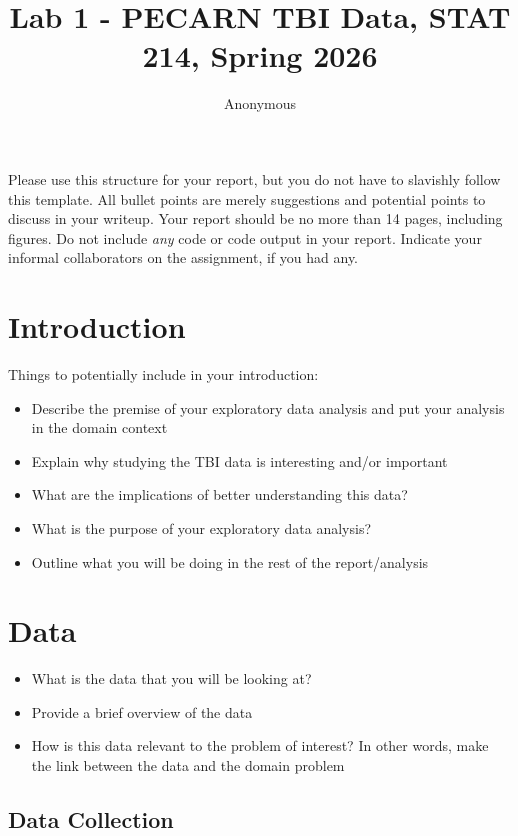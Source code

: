 \documentclass[11pt,letterpaper]{article}
\title{Lab 1 - PECARN TBI Data, STAT 214, Spring 2026}
\author{Anonymous}
\begin{document}
\maketitle

Please use this structure for your report, but you do not have to
slavishly follow this template. All bullet points are merely suggestions
and potential points to discuss in your writeup. Your report should be
no more than 14 pages, including figures. Do not include \emph{any} code
or code output in your report. Indicate your informal collaborators on
the assignment, if you had any.

\section{Introduction}\label{introduction}

Things to potentially include in your introduction:

\begin{itemize}
\item Describe the premise of your exploratory data analysis and put your analysis in the domain context
\item Explain why studying the TBI data is interesting and/or important
\item What are the implications of better understanding this data?
\item What is the purpose of your exploratory data analysis?
\item Outline what you will be doing in the rest of the report/analysis
\end{itemize}


\section{Data}\label{data}

\begin{itemize}
\item What is the data that you will be looking at?
\item Provide a brief overview of the data
\item How is this data relevant to the problem of interest? In other words, make the link between the data and the domain problem
\end{itemize}

\subsection{Data Collection}\label{data-collection}
\end{document}
